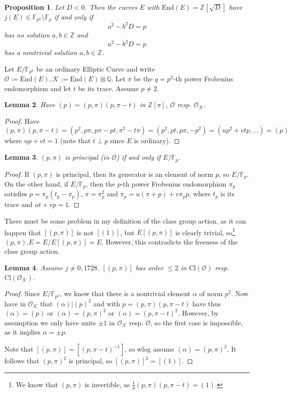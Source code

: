 \documentclass{scrartcl}
\newcommand{\Z}{\mathbb{Z}}
\newcommand{\F}{\mathbb{F}}
\newcommand{\End}{\mathrm{End}}
\newcommand{\Cl}{\mathrm{Cl}}
\newcommand{\K}{\mathcal{K}}
\renewcommand{\O}{\mathcal{O}}
\newtheorem{prop}{Proposition}[section]
\newtheorem{lemma}[prop]{Lemma}
\theoremstyle{definition}
\begin{document}
\begin{prop}
    Let $D < 0$.
    Then the curves $E$ with $\End(E) = \Z[\sqrt{D}]$ have $j(E) \in \F_{p^2} \setminus \F_p$ if and only if
    \begin{equation*}
        a^2 - b^2 D = p
    \end{equation*}
    has no solution $a, b \in \Z$ and
    \begin{equation*}
        a^2 - b^2 D = p
    \end{equation*}
    has a nontrivial solution $a, b \in \Z$.
\end{prop}

Let $E/\F_{p^2}$ be an ordinary Elliptic Curve and write $\O := \End(E), \K := \End(E) \otimes \mathbb{Q}$.
Let $\pi$ be the $q = p^2$-th power Frobenius endomorphism and let $t$ be its trace.
Assume $p \neq 2$.
\begin{lemma}
    Have $(p) = (p, \pi)(p, \pi - t)$ in $\Z[\pi]$, $\O$ resp. $\O_\K$.
\end{lemma}
\begin{proof}
    Have
    \begin{equation*}
        (p, \pi)(p, \pi - t) = (p^2, p\pi, p\pi - pt, \pi^2 - t\pi) = (p^2, pt, p\pi, -p^2) = (up^2 + vtp, ...) = (p)
    \end{equation*}
    where $up + vt = 1$ (note that $t \perp p$ since $E$ is ordinary).
\end{proof}
\begin{lemma}
    $(p, \pi)$ is principal (in $\O$) if and only if $E/\F_p$.
\end{lemma}
\begin{proof}
    If $(p, \pi)$ is principal, then its generator is an element of norm $p$, so $E/\F_p$.
    On the other hand, if $E/\F_p$, then the $p$-th power Frobenius endomorphism $\pi_p$ satisfies $p = \pi_p(t_p - \pi_p)$, $\pi = \pi_p^2$ and $\pi_p = u(\pi + p) + v\pi_p p$, where $t_p$ is its trace and $u t + v p = 1$.
\end{proof}
There must be some problem in my definition of the class group action, as it can happen that $[(p, \pi)]$ is not $[(1)]$, but $E[(p, \pi)]$ is clearly trivial, so\footnote{We know that $(p, \pi)$ is invertible, as $\frac 1 p (p, \pi)(p, \pi - t) = (1)$.} $(p, \pi).E = E/E[(p, \pi)] = E$.
However, this contradicts the freeness of the class group action.
\begin{lemma}
    \label{prop:p_split_order_2}
    Assume $j \neq 0, 1728$.
    $[(p, \pi)]$ has order $\leq 2$ in $\Cl(\O)$ resp. $\Cl(\O_\K)$.
\end{lemma}
\begin{proof}
    Since $E/\F_{p^2}$, we know that there is a nontrivial element $\alpha$ of norm $p^2$.
    Now have in $\O_\K$ that $(\alpha) | (p)^2$ and with $p = (p, \pi)(p, \pi - t)$ have thus $(\alpha) = (p)$ or $(\alpha) = (p, \pi)^2$ or $(\alpha) = (p, \pi - t)^2$.
    However, by assumption we only have units $\pm 1$ in $\O_\K$ resp. $\O$, so the first case is impossible, as it implies $\alpha = \pm p$.

    Note that $[(p, \pi)] = [(p, \pi - t)^{-1}]$, so wlog assume $(\alpha) = (p, \pi)^2$.
    It follows that $(p, \pi)^2$ is principal, so $[(p, \pi)]^2 = [(1)]$.
\end{proof}
\end{document}
